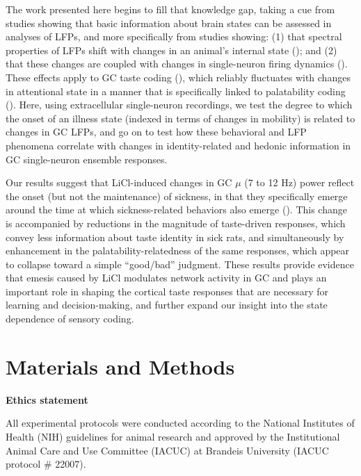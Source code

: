 \begin{refsection}
The work presented here begins to fill that knowledge gap, taking a cue from studies showing that basic information about brain states can be assessed in analyses of LFPs, and more specifically from studies showing: (1) that spectral properties of LFPs shift with changes in an animal’s internal state (\cite{ching2014a,cimenser2011a}); and (2) that these changes are coupled with changes in single-neuron firing dynamics (\cite{olcese2018a,lee2012a,canolty2012a}). These effects apply to GC taste coding (\cite{fontanini2005a}), which reliably fluctuates with changes in attentional state in a manner that is specifically linked to palatability coding (\cite{fontanini2006a}). Here, using extracellular single-neuron recordings, we test the degree to which the onset of an illness state (indexed in terms of changes in mobility) is related to changes in GC LFPs, and go on to test how these behavioral and LFP phenomena correlate with changes in identity-related and hedonic information in GC single-neuron ensemble responses.

Our results suggest that LiCl-induced changes in GC \(\mu\) (7 to 12 Hz) power reflect the onset (but not the maintenance) of sickness, in that they specifically emerge around the time at which sickness-related behaviors also emerge (\cite{parker1982a,nachman1963a,nachman1973a,towers-a,kent1992a}). This change is accompanied by reductions in the magnitude of taste-driven responses, which convey less information about taste identity in sick rats, and simultaneously by enhancement in the palatability-relatedness of the same responses, which appear to collapse toward a simple “good/bad” judgment. These results provide evidence that emesis caused by LiCl modulates network activity in GC and plays an important role in shaping the cortical taste responses that are necessary for learning and decision-making, and further expand our insight into the state dependence of sensory coding.

\section{Materials and Methods}

\smallskip
\noindent\textbf{Ethics statement}\par
\noindent 
All experimental protocols were conducted according to the National Institutes of Health (NIH) guidelines for animal research and approved by the Institutional Animal Care and Use Committee (IACUC) at Brandeis University (IACUC protocol \# 22007).


\end{refsection}
